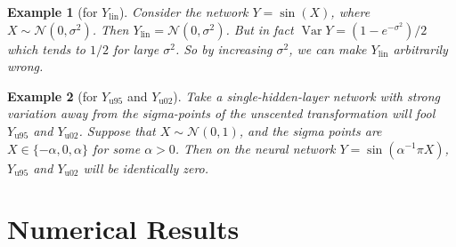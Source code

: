 \documentclass{article}
\newtheorem{example}{Example}
\DeclareMathOperator{\Var}{\operatorname{Var}}
\begin{document}
\begin{example}[for \(Y_\mathrm{lin}\)]
  Consider the network \(Y = \sin(X)\), where \(X \sim \mathcal N ({0, \sigma^2})\).
  Then \(Y_\mathrm{lin} = \mathcal{N}(0, \sigma^2)\).
  But in fact \(\Var Y = (1 - e^{-\sigma^2})/2\) which tends to \(1/2\) for large \(\sigma^2\).
  So by increasing \(\sigma^2\), we can make \(Y_\mathrm{lin}\) arbitrarily wrong.
\end{example}



\begin{example}[for \(Y_\mathrm{u95}\) and \(Y_\mathrm{u02}\)]
  Take a single-hidden-layer network with strong variation away from the sigma-points of the unscented transformation will fool \(Y_\mathrm{u95}\) and \(Y_\mathrm{u02}\).
  Suppose that \(X \sim \mathcal N(0, 1)\), and the sigma points are \(X \in \{-\alpha, 0, \alpha\}\) for some \(\alpha > 0\).
  Then on the neural network \(Y = \sin(\alpha^{-1}\pi X)\), \(Y_\mathrm{u95}\) and \(Y_\mathrm{u02}\) will be identically zero.
\end{example}


\section{Numerical Results}
\end{document}
